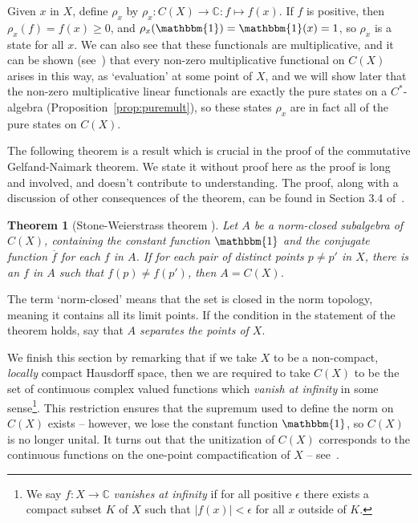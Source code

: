 \documentclass[11pt,a4paper]{report}
\theoremstyle{plain}
\newtheorem*{thm*}{Theorem}
\theoremstyle{definition}
\newcommand{\1}{\mathbbm{1}}
\newcommand{\C}{\mathbb{C}}
\newcommand{\CX}{C(X)}
\renewcommand{\bar}{\overline}
\begin{document}
Given $x$ in $X$, define $\rho_x$ by $\rho_x:\CX\to\C:f\mapsto f(x)$. If $f$ is 
positive, then $\rho_x(f) = f(x) \geq 0$, and $\rho_x(\1) = \1(x)=1$, so $\rho_x$ is a 
state for all $x$. We can also see that these functionals are multiplicative, 
and it can be shown (see~\cite[Corollary 3.4.2]{kadison83}) that every non-zero 
multiplicative functional on $\CX$ arises in this way, as `evaluation' at some 
point of $X$, and we will show later that the non-zero multiplicative linear 
functionals are exactly the pure states on a $C^\ast$-algebra 
(Proposition~\ref{prop:puremult}), so these states $\rho_x$ are in fact all of 
the pure states on $\CX$.


The following theorem is a result which is crucial in the proof of the commutative 
Gelfand-Naimark theorem. We state it without proof here as the proof is long and 
involved, and doesn't contribute to understanding. The proof, along with a 
discussion of other consequences of the theorem, can be found in Section 3.4 
of~\cite{kadison83}.


\begin{thm*}[Stone-Weierstrass theorem {\cite[3.4.15]{kadison83}}]
	Let $A$ be a norm-closed subalgebra of $\CX$, containing the constant function 
	$\1$ and the conjugate function $\bar f$ for each $f$ in $A$. If for each pair 
	of distinct points $p\not=p'$ in $X$, there is an $f$ in $A$ such that 
	$f(p)\not=f(p')$, then $A=\CX$.

\end{thm*}

The term `norm-closed' means that the set is closed in the norm topology, 
meaning it contains all its limit points. If the condition in the statement of 
the theorem holds, say that \emph{$A$ separates the points of $X$}.


We finish this section by remarking that if we take $X$ to be a non-compact, 
\emph{locally} compact Hausdorff space, then we are required to take $\CX$ to be 
the set of continuous complex valued functions which \emph{vanish at infinity} 
in some sense\footnote{We say $f:X\to\C$ \emph{vanishes at infinity} if for all 
positive $\epsilon$ there exists a compact subset $K$ of $X$ such that 
$\left|f(x)\right|<\epsilon$ for all $x$ outside of $K$.}. This restriction 
ensures that the supremum used to define the norm on $\CX$ exists -- however, we 
lose the constant function $\1$, so $\CX$ is no longer unital. 
It turns out that the unitization of $\CX$ corresponds to the continuous 
functions on the one-point compactification of $X$ -- see~\cite[II.1.2.2]{blackadar06}.
\end{document}
